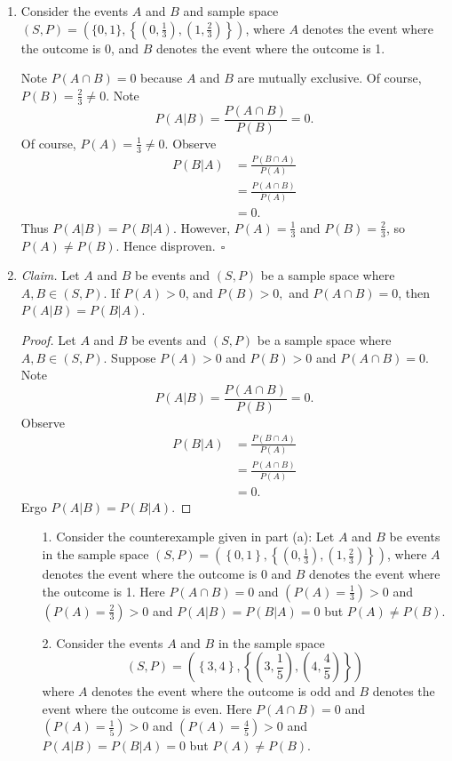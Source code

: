 \documentclass{article}
\theoremstyle{definition}
\begin{document}
\begin{solution}
\begin{enumerate}
\item Consider the events $A$ and $B$ and sample space $(S,P)=\left(\{0,1\},\left\{(0,\frac{1}{3}),(1,\frac{2}{3})\right\}\right)$, where $A$ denotes the event where the outcome is 0, and $B$ denotes the event where the outcome is 1.

Note $P(A\cap B)=0$ because $A$ and $B$ are mutually exclusive. Of course, $P(B)=\frac{2}{3}\neq 0$. Note
\[P(A|B)=\frac{P(A\cap B)}{P(B)}=0.\] Of course, $P(A)=\frac{1}{3}\neq 0$. Observe
\begin{align*}
P(B|A)
&=\frac{P(B\cap A)}{P(A)}\\
&=\frac{P(A\cap B)}{P(A)}\\
&=0.
\end{align*}
Thus $P(A|B)=P(B|A)$. However, $P(A)=\frac{1}{3}$ and $P(B)=\frac{2}{3}$, so $P(A)\neq P(B)$. Hence disproven.$~~\square$
\item\textit{Claim. }Let $A$ and $B$ be events and $(S,P)$ be a sample space where $A,B\in(S,P)$. If $P(A)>0$, and $P(B)>0,$ and $P(A\cap B)=0$, then $P(A|B)=P(B|A)$.
\begin{proof}
Let $A$ and $B$ be events and $(S,P)$ be a sample space where $A,B\in(S,P)$. Suppose $P(A)>0$ and $P(B)>0$ and $P(A\cap B)=0$. Note
\[P(A|B)=\frac{P(A\cap B)}{P(B)}=0.\] Observe
\begin{align*}
P(B|A)
&=\frac{P(B\cap A)}{P(A)}\\
&=\frac{P(A\cap B)}{P(A)}\\
&=0.
\end{align*}
Ergo $P(A|B)=P(B|A)$.
\end{proof}
\begin{enumerate}
\item[1.] Consider the counterexample given in part (a): Let $A$ and $B$ be events in the sample space $(S,P)=\left(\left\{0,1\right\},\left\{\left(0,\frac{1}{3}\right),\left(1,\frac{2}{3}\right)\right\}\right)$, where $A$ denotes the event where the outcome is 0 and $B$ denotes the event where the outcome is 1. Here $P(A\cap B)=0$ and $\left(P(A)=\frac{1}{3}\right)>0$ and $\left(P(A)=\frac{2}{3}\right)>0$ and $P(A|B)=P(B|A)=0$ but $P(A)\neq P(B)$.
\item[2.] Consider the events $A$ and $B$ in the sample space \[(S,P)=\left(\left\{3,4\right\},\left\{\left(3,\frac{1}{5}\right),\left(4,\frac{4}{5}\right)\right\}\right)\] where $A$ denotes the event where the outcome is odd and $B$ denotes the event where the outcome is even. Here $P(A\cap B)=0$ and $\left(P(A)=\frac{1}{5}\right)>0$ and $\left(P(A)=\frac{4}{5}\right)>0$ and $P(A|B)=P(B|A)=0$ but $P(A)\neq P(B)$.
\end{enumerate}
\end{enumerate}
\end{solution}
\end{document}
